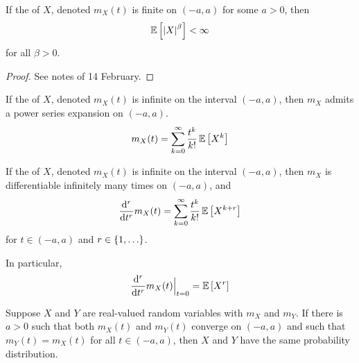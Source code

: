 \documentclass[11pt]{article}
\begin{document}
\begin{thm}
    If the \mgf{} of $X$,
    denoted $m_X(t)$ is finite on $(-a, a)$
    for some $a > 0$,
    then
    \begin{equation*}
        \operatorname{\mathbb{E}}{\left[\left\lvert X\right\rvert^\beta\right]} < \infty
    \end{equation*}
    for all $\beta > 0$.
\end{thm}

\begin{proof}
    See notes of 14 February.
\end{proof}

\begin{thm}
    If the \mgf{} of $X$, denoted $m_X(t)$ is infinite on the interval
    $(-a, a)$,
    then $m_X$ admits a power series expansion on $(-a, a)$.
    \begin{equation*}
        m_X(t)
        = \sum^\infty_{k=0} {
            \frac{t^k}{k!}
            \operatorname{\mathbb{E}}{\left[X^k\right]}
        }
    \end{equation*}
\end{thm}

\omittedproof

\begin{cor}
    If the \mgf{} of $X$, denoted $m_X(t)$ is infinite on the interval
    $(-a, a)$,
    then $m_X$ is differentiable infinitely many times on $(-a, a)$,
    and
    \begin{equation*}
        \frac{\mathrm{d}^{r}}{\mathrm{d} {t}^{r}} m_X(t)
        =
        \sum^\infty_{k=0} {
            \frac{t^k}{k!}
            \operatorname{\mathbb{E}}{\left[X^{k+r}\right]}
        }
    \end{equation*}
    for $t \in (-a, a)$ and $r \in \range[1]{}$.

    In particular,
    \begin{equation*}
        \nderiv{r}{t} m_X(t) \evaluated{t=0} = \E{X^r}
    \end{equation*}
\end{cor}

\begin{thm}
    Suppose $X$ and $Y$ are real-valued random variables
    with \mgf $m_X$ and $m_Y$.
    If there is $a > 0$ such that both $m_X(t)$ and $m_Y(t)$ converge on
    $(-a, a)$ and such that $m_Y(t) = m_X(t)$ for all $t \in (-a, a)$,
    then $X$ and $Y$ have the same probability distribution.
\end{thm}

\omittedproof
\end{document}
